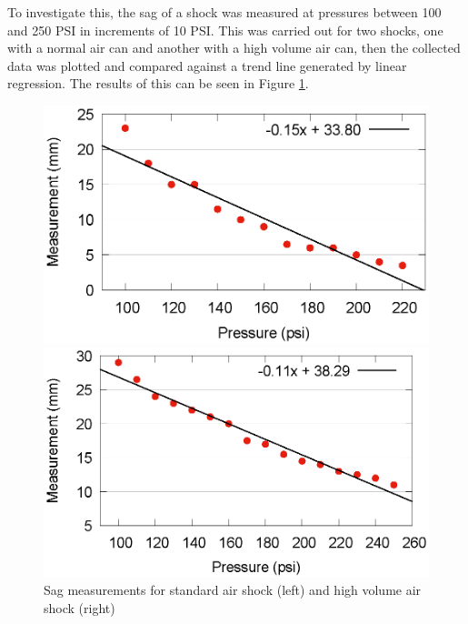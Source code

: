 			To investigate this, the sag of a shock was measured at pressures between 100 and 250 PSI in increments of 10 PSI. This was carried out for two shocks, one with a normal air can and another with a high volume air can, then the collected data was plotted and compared against a trend line generated by linear regression. The results of this can be seen in Figure \ref{fig:scatters}.
			\begin{figure}[h!]
				\centering
				\begin{minipage}{0.4\textwidth}
					\centering
					\includegraphics[width=\textwidth]{../images/results/fox_scatter.eps}
				\end{minipage}
				\begin{minipage}{0.4\textwidth}
					\centering
					\includegraphics[width=\textwidth]{../images/results/rs_scatter.eps}
				\end{minipage}
				\caption{Sag measurements for standard air shock (left) and high volume air shock (right)}
				\label{fig:scatters}
			\end{figure}\\
